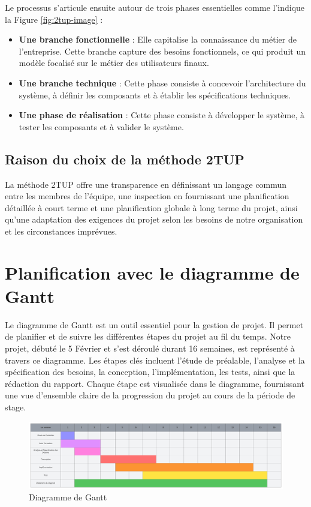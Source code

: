 \noindent Le processus s'articule ensuite autour de trois phases essentielles comme l'indique la Figure \ref{fig:2tup-image} :
\begin{itemize}[itemsep=2pt, parsep=2pt]
    \item \textbf{Une branche fonctionnelle} : Elle capitalise la connaissance du métier de l’entreprise. Cette branche capture des besoins fonctionnels, ce qui produit un modèle focalisé sur le métier des utilisateurs finaux.
    \item \textbf{Une branche technique} : Cette phase consiste à concevoir l'architecture du système, à définir les composants et à établir les spécifications techniques.
    \item \textbf{Une phase de réalisation} : Cette phase consiste à développer le système, à tester les composants et à valider le système.
\end{itemize}

\subsection{Raison du choix de la méthode 2TUP}
La méthode 2TUP offre une transparence en définissant un langage commun entre les membres de l'équipe, une inspection en fournissant une planification détaillée à court terme et une planification globale à long terme du projet, ainsi qu'une adaptation des exigences du projet selon les besoins de notre organisation et les circonstances imprévues.

\section{Planification avec le diagramme de Gantt}
Le diagramme de Gantt est un outil essentiel pour la gestion de projet. Il permet de planifier et de suivre les différentes étapes du projet au fil du temps. Notre projet, débuté le 5 Février et s’est déroulé durant 16 semaines, est représenté à travers ce diagramme. Les étapes clés incluent l'étude de préalable, l'analyse et la spécification des besoins, la conception, l'implémentation, les tests, ainsi que la rédaction du rapport. Chaque étape est visualisée dans le diagramme, fournissant une vue d'ensemble claire de la progression du projet au cours de la période de stage.
\begin{figure}[H]
    \centering
    \includegraphics[width=1.1\textwidth,height=0.55\textwidth]{images/chapitre-1/gant.png}
    \caption{Diagramme de Gantt}
    \label{fig:gantt-diagram}    
\end{figure}

